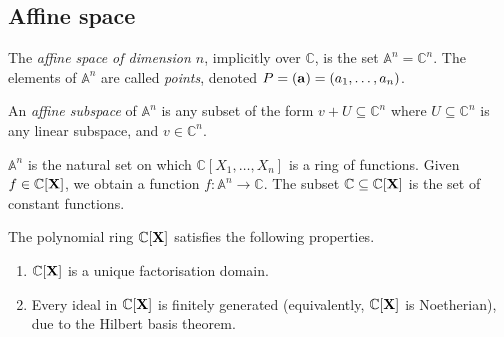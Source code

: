 \subsection{Affine space}
\begin{definition}
    The \emph{affine space of dimension \( n \)}, implicitly over \( \mathbb C \), is the set \( \mathbb A^n = \mathbb C^n \).
    The elements of \( \mathbb A^n \) are called \emph{points}, denoted \( P = (\vb a) = (a_1, \dots, a_n) \).
\end{definition}
\begin{definition}
    An \emph{affine subspace} of \( \mathbb A^n \) is any subset of the form \( v + U \subseteq \mathbb C^n \) where \( U \subseteq \mathbb C^n \) is any linear subspace, and \( v \in \mathbb C^n \).
\end{definition}
\( \mathbb A^n \) is the natural set on which \( \mathbb C[X_1, \dots, X_n] \) is a ring of functions.
Given \( f \in \mathbb C[\vb X] \), we obtain a function \( f \colon \mathbb A^n \to \mathbb C \).
The subset \( \mathbb C \subseteq \mathbb C[\vb X] \) is the set of constant functions.
\begin{proposition}
    The polynomial ring \( \mathbb C[\vb X] \) satisfies the following properties.
    \begin{enumerate}
        \item \( \mathbb C[\vb X] \) is a unique factorisation domain.
        \item Every ideal in \( \mathbb C[\vb X] \) is finitely generated (equivalently, \( \mathbb C[\vb X] \) is Noetherian), due to the Hilbert basis theorem.
    \end{enumerate}
\end{proposition}

